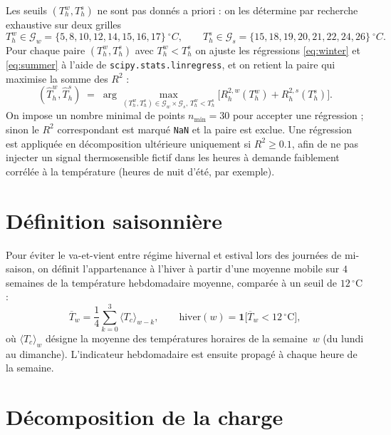 \documentclass[11pt,a4paper]{article}
\begin{document}
Les seuils $(T_h^{w},T_h^{s})$ ne sont pas donn\'es a priori : on les d\'etermine par recherche exhaustive sur deux grilles
\[
  T_h^{w}\in\mathcal{G}_w=\{5,8,10,12,14,15,16,17\}~^{\circ}C,\qquad
  T_h^{s}\in\mathcal{G}_s=\{15,18,19,20,21,22,24,26\}~^{\circ}C.
\]
Pour chaque paire $(T_h^{w},T_h^{s})$ avec $T_h^{w}<T_h^{s}$ on ajuste les r\'egressions \eqref{eq:winter} et \eqref{eq:summer} \`a l'aide de \texttt{scipy.stats.linregress}, et on retient la paire qui maximise la somme des $R^2$ :
\begin{equation}
  (\hat T_h^{w},\hat T_h^{s})\;=\;\arg\max_{(T_h^{w},T_h^{s})\in\mathcal{G}_w\times\mathcal{G}_s,\,T_h^{w}<T_h^{s}}
    \Big[R_h^{2,w}(T_h^{w})+R_h^{2,s}(T_h^{s})\Big].
  \label{eq:gridsearch}
\end{equation}
On impose un nombre minimal de points $n_{\min}=30$ pour accepter une r\'egression ; sinon le $R^2$ correspondant est marqu\'e \texttt{NaN} et la paire est exclue. Une r\'egression est appliqu\'ee en d\'ecomposition ult\'erieure uniquement si $R^2\geq 0.1$, afin de ne pas injecter un signal thermosensible fictif dans les heures \`a demande faiblement corr\'el\'ee \`a la temp\'erature (heures de nuit d'\'et\'e, par exemple).

\section{D\'efinition saisonni\`ere}

Pour \'eviter le va-et-vient entre r\'egime hivernal et estival lors des journ\'ees de mi-saison, on d\'efinit l'appartenance \`a l'hiver \`a partir d'une moyenne mobile sur $4$ semaines de la temp\'erature hebdomadaire moyenne, compar\'ee \`a un seuil de $12\,^{\circ}\mathrm{C}$ :
\begin{equation}
  \overline{T}_w=\frac{1}{4}\sum_{k=0}^{3}\langle T_c\rangle_{w-k},\qquad
  \text{hiver}(w)=\mathbf{1}\big[\overline{T}_w < 12\,^{\circ}\mathrm{C}\big],
  \label{eq:season}
\end{equation}
o\`u $\langle T_c\rangle_w$ d\'esigne la moyenne des temp\'eratures horaires de la semaine~$w$ (du lundi au dimanche). L'indicateur hebdomadaire est ensuite propag\'e \`a chaque heure de la semaine.

\section{D\'ecomposition de la charge}
\end{document}
